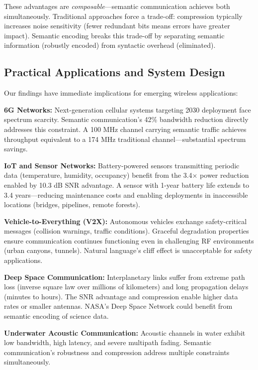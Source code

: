 \documentclass[conference]{IEEEtran}
\begin{document}
These advantages are \textit{composable}—semantic communication achieves 
both simultaneously. Traditional approaches force a trade-off: compression 
typically increases noise sensitivity (fewer redundant bits means errors 
have greater impact). Semantic encoding breaks this trade-off by separating 
semantic information (robustly encoded) from syntactic overhead (eliminated).

\subsection{Practical Applications and System Design}

Our findings have immediate implications for emerging wireless applications:

\textbf{6G Networks:} Next-generation cellular systems targeting 2030 
deployment face spectrum scarcity. Semantic communication's 42\% bandwidth 
reduction directly addresses this constraint. A 100 MHz channel carrying 
semantic traffic achieves throughput equivalent to a 174 MHz traditional 
channel—substantial spectrum savings.

\textbf{IoT and Sensor Networks:} Battery-powered sensors transmitting 
periodic data (temperature, humidity, occupancy) benefit from the 3.4× 
power reduction enabled by 10.3 dB SNR advantage. A sensor with 1-year 
battery life extends to 3.4 years—reducing maintenance costs and enabling 
deployments in inaccessible locations (bridges, pipelines, remote forests).

\textbf{Vehicle-to-Everything (V2X):} Autonomous vehicles exchange safety-critical 
messages (collision warnings, traffic conditions). Graceful degradation 
properties ensure communication continues functioning even in challenging 
RF environments (urban canyons, tunnels). Natural language's cliff effect 
is unacceptable for safety applications.

\textbf{Deep Space Communication:} Interplanetary links suffer from extreme 
path loss (inverse square law over millions of kilometers) and long propagation 
delays (minutes to hours). The SNR advantage and compression enable higher 
data rates or smaller antennas. NASA's Deep Space Network could benefit 
from semantic encoding of science data.

\textbf{Underwater Acoustic Communication:} Acoustic channels in water 
exhibit low bandwidth, high latency, and severe multipath fading. Semantic 
communication's robustness and compression address multiple constraints 
simultaneously.
\end{document}
